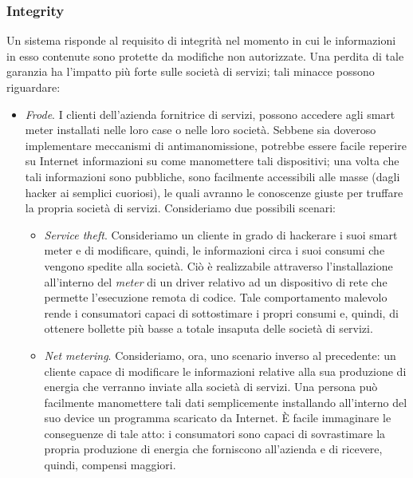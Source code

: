 \subsubsection{Integrity}
Un sistema risponde al requisito di integrità nel momento in cui le informazioni in esso contenute sono protette da modifiche non autorizzate. Una perdita di tale garanzia ha l'impatto più forte sulle società di servizi; tali minacce possono riguardare:
\begin{itemize}
\item \textit{Frode}. I clienti dell'azienda fornitrice di servizi, possono accedere agli smart meter installati nelle loro case o nelle loro società. Sebbene sia doveroso implementare meccanismi di antimanomissione, potrebbe essere facile reperire su Internet informazioni su come manomettere tali dispositivi; una volta che tali informazioni sono pubbliche, sono facilmente accessibili alle masse (dagli hacker ai semplici cuoriosi), le quali avranno le conoscenze giuste per truffare la propria società di servizi. Consideriamo due possibili scenari:
	\begin{itemize}
	\item \textit{Service theft}. Consideriamo un cliente in grado di hackerare i suoi smart meter e di modificare, quindi, le informazioni circa i suoi consumi che vengono spedite alla società. Ciò è realizzabile attraverso l'installazione all'interno del \textit{meter} di un driver relativo ad un dispositivo di rete che permette l'esecuzione remota di codice. Tale comportamento malevolo rende i consumatori capaci di sottostimare i propri consumi e, quindi, di ottenere bollette più basse a totale insaputa delle società di servizi.
	\item \textit{Net metering}. Consideriamo, ora, uno scenario inverso al precedente: un cliente capace di modificare le informazioni relative alla sua produzione di energia che verranno inviate alla società di servizi. Una persona può facilmente manomettere tali dati semplicemente installando all'interno del suo device un programma scaricato da Internet. È facile immaginare le conseguenze di tale atto: i consumatori sono capaci di sovrastimare la propria produzione di energia che forniscono all'azienda e di ricevere, quindi, compensi maggiori.
	\end{itemize}

\end{itemize}
